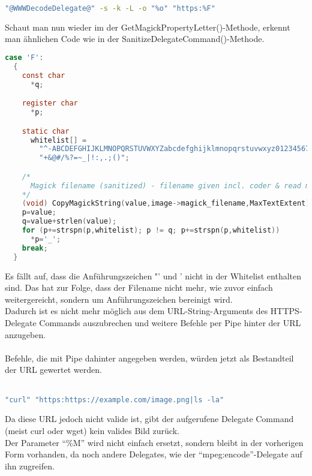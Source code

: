\begin{lstlisting}[firstnumber=1, language=Bash, caption=Aufgelöster https-Delegate-Befehl 6.9.3-10,label={lst:lstlisting}]
"@WWWDecodeDelegate@" -s -k -L -o "%o" "https:%F"
\end{lstlisting}
\vspace{5mm}

Schaut man nun wieder im der GetMagickPropertyLetter()-Methode, erkennt man ähnlichen Code wie in der SanitizeDelegateCommand()-Methode.

\begin{lstlisting}[firstnumber=2610, language=C, caption=magick/property.c Gefilterte Wietergabe F-Parameter,label={lst:lstlisting}]
  case 'F':
  {
    const char
      *q;

    register char
      *p;

    static char
      whitelist[] =
        "^-ABCDEFGHIJKLMNOPQRSTUVWXYZabcdefghijklmnopqrstuvwxyz0123456789"
        "+&@#/%?=~_|!:,.;()";

    /*
      Magick filename (sanitized) - filename given incl. coder & read mods.
    */
    (void) CopyMagickString(value,image->magick_filename,MaxTextExtent);
    p=value;
    q=value+strlen(value);
    for (p+=strspn(p,whitelist); p != q; p+=strspn(p,whitelist))
      *p='_';
    break;
  }
\end{lstlisting}
\vspace{5mm}

Es fällt auf, dass die Anführungszeichen "' und ' nicht in der Whitelist enthalten sind.
Das hat zur Folge, dass der Filename nicht mehr, wie zuvor einfach weitergereicht, sondern um Anführungszeichen bereinigt wird.\\

Dadurch ist es nicht mehr möglich aus dem URL-String-Arguments des HTTPS-Delegate Commands auszubrechen und weitere Befehle per Pipe hinter der URL anzugeben.\\\\
Befehle, die mit Pipe dahinter angegeben werden, würden jetzt als Bestandteil der URL gewertet werden.\\\\

\begin{lstlisting}[language=Bash, caption=Vereinfachtes Beispiel für HTTPS Delegate-Command nach dem Ersetzen der Platzhalter,label={lst:simpleexampleafter}]
"curl" "https:https://example.com/image.png|ls -la"
\end{lstlisting}
\vspace{5mm}

Da diese URL jedoch nicht valide ist, gibt der aufgerufene Delegate Command (meist curl oder wget) kein valides Bild zurück.\\

Der Parameter "`\%M"' wird nicht einfach ersetzt, sondern bleibt in der vorherigen Form vorhanden, da noch andere Delegates, wie der "`mpeg:encode"'-Delegate auf ihn zugreifen.\\